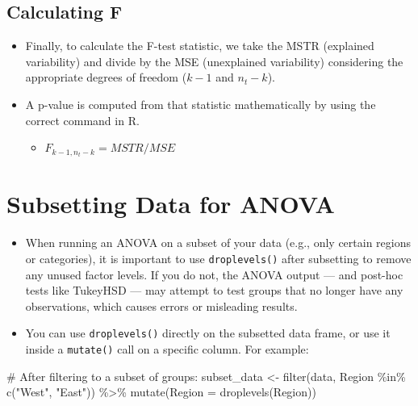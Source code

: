 \documentclass[
  letterpaper,
  DIV=11,
  numbers=noendperiod]{scrreprt}
\newenvironment{Shaded}{\begin{snugshade}}{\end{snugshade}}
\newcommand{\AttributeTok}[1]{\textcolor[rgb]{0.40,0.45,0.13}{#1}}
\newcommand{\CommentTok}[1]{\textcolor[rgb]{0.37,0.37,0.37}{#1}}
\newcommand{\FunctionTok}[1]{\textcolor[rgb]{0.28,0.35,0.67}{#1}}
\newcommand{\NormalTok}[1]{\textcolor[rgb]{0.00,0.23,0.31}{#1}}
\newcommand{\OtherTok}[1]{\textcolor[rgb]{0.00,0.23,0.31}{#1}}
\newcommand{\SpecialCharTok}[1]{\textcolor[rgb]{0.37,0.37,0.37}{#1}}
\newcommand{\StringTok}[1]{\textcolor[rgb]{0.13,0.47,0.30}{#1}}
\providecommand{\tightlist}{%
  \setlength{\itemsep}{0pt}\setlength{\parskip}{0pt}}\usepackage{longtable,booktabs,array}
\begin{document}
\subsection{Calculating F}\label{calculating-f}

\begin{itemize}
\tightlist
\item
  Finally, to calculate the F-test statistic, we take the MSTR
  (explained variability) and divide by the MSE (unexplained
  variability) considering the appropriate degrees of freedom (\(k-1\)
  and \(n_t-k\)).
\item
  A p-value is computed from that statistic mathematically by using the
  correct command in R.

  \begin{itemize}
  \tightlist
  \item
    \(F_{k-1,n_t-k} = MSTR/MSE\)
  \end{itemize}
\end{itemize}

\section{Subsetting Data for ANOVA}\label{subsetting-data-for-anova}

\begin{itemize}
\item
  When running an ANOVA on a subset of your data (e.g., only certain
  regions or categories), it is important to use \texttt{droplevels()}
  after subsetting to remove any unused factor levels. If you do not,
  the ANOVA output --- and post-hoc tests like TukeyHSD --- may attempt
  to test groups that no longer have any observations, which causes
  errors or misleading results.
\item
  You can use \texttt{droplevels()} directly on the subsetted data
  frame, or use it inside a \texttt{mutate()} call on a specific column.
  For example:
\end{itemize}

\begin{Shaded}
\begin{Highlighting}[]
\CommentTok{\# After filtering to a subset of groups:}
\NormalTok{subset\_data }\OtherTok{\textless{}{-}} \FunctionTok{filter}\NormalTok{(data, Region }\SpecialCharTok{\%in\%} \FunctionTok{c}\NormalTok{(}\StringTok{"West"}\NormalTok{, }\StringTok{"East"}\NormalTok{)) }\SpecialCharTok{\%\textgreater{}\%}
    \FunctionTok{mutate}\NormalTok{(}\AttributeTok{Region =} \FunctionTok{droplevels}\NormalTok{(Region))}
\end{Highlighting}
\end{Shaded}
\end{document}
